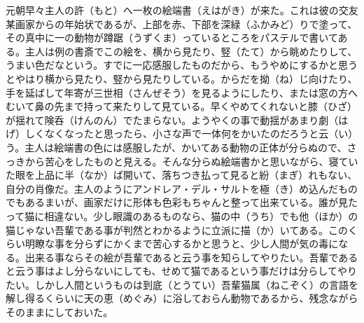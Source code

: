 \documentclass{book}
\begin{document}
元朝早々主人の許（もと）へ一枚の絵端書（えはがき）が来た。これは彼の交友某画家からの年始状であるが、上部を赤、下部を深緑（ふかみど）りで塗って、その真中に一の動物が蹲踞（うずくま）っているところをパステルで書いてある。主人は例の書斎でこの絵を、横から見たり、竪（たて）から眺めたりして、うまい色だなという。すでに一応感服したものだから、もうやめにするかと思うとやはり横から見たり、竪から見たりしている。からだを拗（ね）じ向けたり、手を延ばして年寄が三世相（さんぜそう）を見るようにしたり、または窓の方へむいて鼻の先まで持って来たりして見ている。早くやめてくれないと膝（ひざ）が揺れて険呑（けんのん）でたまらない。ようやくの事で動揺があまり劇（はげ）しくなくなったと思ったら、小さな声で一体何をかいたのだろうと云（い）う。主人は絵端書の色には感服したが、かいてある動物の正体が分らぬので、さっきから苦心をしたものと見える。そんな分らぬ絵端書かと思いながら、寝ていた眼を上品に半（なか）ば開いて、落ちつき払って見ると紛（まぎ）れもない、自分の肖像だ。主人のようにアンドレア・デル・サルトを極（き）め込んだものでもあるまいが、画家だけに形体も色彩もちゃんと整って出来ている。誰が見たって猫に相違ない。少し眼識のあるものなら、猫の中（うち）でも他（ほか）の猫じゃない吾輩である事が判然とわかるように立派に描（か）いてある。このくらい明瞭な事を分らずにかくまで苦心するかと思うと、少し人間が気の毒になる。出来る事ならその絵が吾輩であると云う事を知らしてやりたい。吾輩であると云う事はよし分らないにしても、せめて猫であるという事だけは分らしてやりたい。しかし人間というものは到底（とうてい）吾輩猫属（ねこぞく）の言語を解し得るくらいに天の恵（めぐみ）に浴しておらん動物であるから、残念ながらそのままにしておいた。
\end{document}
